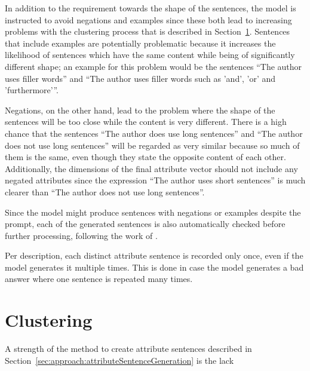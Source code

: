 In addition to the requirement towards the shape of the sentences, the model is instructed to avoid negations and examples since these both lead to increasing problems with the clustering process that is described in Section~\ref{sec:approach:clustering}. %
Sentences that include examples are potentially problematic because it increases the likelihood of sentences which have the same content while being of significantly different shape; an example for this problem would be the sentences \enquote{The author uses filler words} and \enquote{The author uses filler words such as 'and', 'or' and 'furthermore'}.%

Negations, on the other hand, lead to the problem where the shape of the sentences will be too close while the content is very different. There is a high chance that the sentences \enquote{The author does use long sentences} and \enquote{The author does not use long sentences} will be regarded as very similar because so much of them is the same, even though they state the opposite content of each other.
Additionally, the dimensions of the final attribute vector should not include any negated attributes since the expression \enquote{The author uses short sentences} is much clearer than \enquote{The author does not use long sentences}.

Since the model might produce sentences with negations or examples despite the prompt, each of the generated sentences is also automatically checked before further processing, following the work of \citet{patelLearningInterpretableStyle2023}.

Per description, each distinct attribute sentence is recorded only once, even if the model generates it multiple times. This is done in case the model generates a bad answer where one sentence is repeated many times.


\section{Clustering}%
\label{sec:approach:clustering}
A strength of the method to create attribute sentences described in Section~\ref{sec:approach:attributeSentenceGeneration} is the lack %

